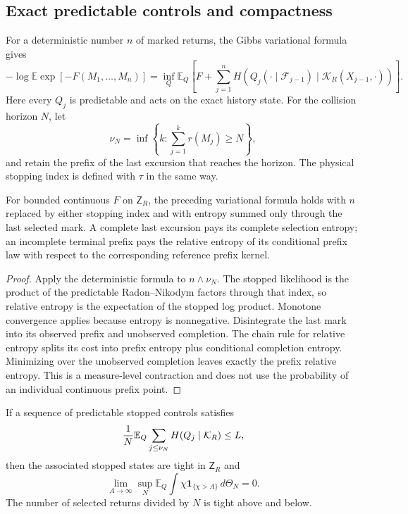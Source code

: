 \subsection{Exact predictable controls and compactness}

For a deterministic number $n$ of marked returns, the Gibbs variational
formula gives
\[
 -\log\mathbb E\exp[-F(M_1,\ldots,M_n)]
 =\inf_Q\mathbb E_Q\left[F+
 \sum_{j=1}^n
 H(Q_j(\cdot\mid\mathcal F_{j-1})\mid
   \mathcal K_R(X_{j-1},\cdot))\right].
\]
Here every $Q_j$ is predictable and acts on the exact history state.  For the
collision horizon $N$, let
\[
 \nu_N=\inf\left\{k:\sum_{j=1}^kr(M_j)\ge N\right\},
\]
and retain the prefix of the last excursion that reaches the horizon.  The
physical stopping index is defined with $\tau$ in the same way.

\begin{theorem}
\label{thm:r21-a3-entropy}
For bounded continuous $F$ on $\mathsf Z_R$, the preceding variational formula
holds with $n$ replaced by either stopping index and with entropy summed only
through the last selected mark.  A complete last excursion pays its complete
selection entropy; an incomplete terminal prefix pays the relative entropy of
its conditional prefix law with respect to the corresponding reference
prefix kernel.
\end{theorem}

\begin{proof}
Apply the deterministic formula to $n\wedge\nu_N$.  The stopped likelihood is
the product of the predictable Radon--Nikodym factors through that index, so
relative entropy is the expectation of the stopped log product.  Monotone
convergence applies because entropy is nonnegative.  Disintegrate the last
mark into its observed prefix and unobserved completion.  The chain rule for
relative entropy splits its cost into prefix entropy plus conditional
completion entropy.  Minimizing over the unobserved completion leaves exactly
the prefix relative entropy.  This is a measure-level contraction and does
not use the probability of an individual continuous prefix point.
\end{proof}

\begin{lemma}
\label{lem:r21-a3-compact}
If a sequence of predictable stopped controls satisfies
\[
 {1\over N}\mathbb E_Q
 \sum_{j\le\nu_N}H(Q_j\mid\mathcal K_R)\le L,
\]
then the associated stopped states are tight in $\mathsf Z_R$ and
\[
 \lim_{A\to\infty}\sup_N
 \mathbb E_Q\int\chi\mathbf1_{\{\chi>A\}}\,d\Theta_N=0.
\]
The number of selected returns divided by $N$ is tight above and below.
\end{lemma}

